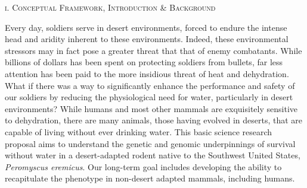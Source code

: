 \documentclass[12pt]{article}
\begin{document}
%
%
%
%
%
%

\setcounter{page}{1}
\normalsize 
\begin{center}
\textsc{{i. Conceptual Framework, Introduction \& Background}} \\
\end{center}
Every day, soldiers serve in desert environments, forced to endure the intense head and aridity inherent to these environments. Indeed, these environmental stressors may in fact pose a greater threat that that of enemy combatants. While billions of dollars has been spent on protecting soldiers from bullets, far less attention has been paid to the more insidious threat of heat and dehydration. What if there was a way to significantly enhance the performance and safety of our soldiers by reducing the physiological need for water, particularly in desert environments? While humans and most other mammals are exquisitely sensitive to dehydration, there are many animals, those having evolved in deserts, that are capable of living without ever drinking water. This basic science research proposal aims to understand the genetic and genomic underpinnings of survival without water in a desert-adapted rodent native to the Southwest United States, \textit{Peromyscus eremicus}. Our long-term goal includes developing the ability to recapitulate the phenotype in non-desert adapted mammals, including humans.
\end{document}
